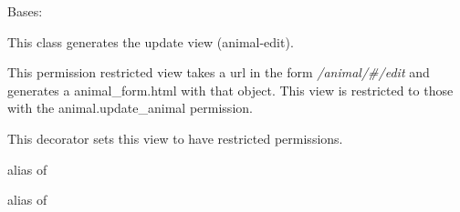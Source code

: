 \documentclass[letterpaper,10pt,english]{sphinxmanual}
\begin{document}
\begin{fulllineitems}
\label{api:mousedb.animal.views.AnimalUpdate}
Bases: \href{http://docs.djangoproject.com/en/dev/ref/class-based-views/\#django.views.generic.edit.UpdateView}{}

This class generates the update {\hyperref[api:mousedb.animal.models.Animal]{}} view (animal-edit).

This permission restricted view takes a url in the form \emph{/animal/\#/edit} and generates a animal\_form.html with that object.
This view is restricted to those with the animal.update\_animal permission.

\begin{fulllineitems}
\label{api:mousedb.animal.views.AnimalUpdate.context_object_name}
\end{fulllineitems}


\begin{fulllineitems}
\label{api:mousedb.animal.views.AnimalUpdate.dispatch}
This decorator sets this view to have restricted permissions.

\end{fulllineitems}


\begin{fulllineitems}
\label{api:mousedb.animal.views.AnimalUpdate.form_class}
alias of 

\end{fulllineitems}


\begin{fulllineitems}
\label{api:mousedb.animal.views.AnimalUpdate.model}
alias of 

\end{fulllineitems}


\begin{fulllineitems}
\label{api:mousedb.animal.views.AnimalUpdate.template_name}
\end{fulllineitems}


\end{fulllineitems}
\end{document}
